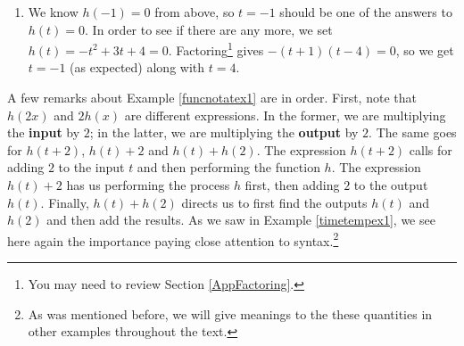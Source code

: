 \documentclass{ximera}
\begin{document}
\begin{example}
\begin{explanation}
\begin{enumerate}
\begin{enumerate}
\item  To find $h(t + 2)$, we substitute the quantity $t + 2$ in place of $t$: \[ \begin{array}{rclr}  
h(t + 2) & = & -(t + 2)^2 + 3(t + 2) + 4 & \\  
         & = & -\left(t\,^{2} + 4t + 4\right) + (3t + 6) + 4 & \\  
         & = & -t\,^{2} - 4t - 4 + 3t + 6 + 4 &  \\  
         & = & -t\,^{2} - t + 6. & 
       \end{array} \] To find $h(t) + 2$, we add $2$ to the expression for $h(t)$ \[ \begin{array}{rclr}  
h(t) + 2 & = & \left(-t\,^{2} + 3t + 4\right) + 2  & \\  
         & = & -t\,^{2} + 3t + 6. \\ 
         \end{array} \] From our work above, we see that $h(2) = 6$ so \[ \begin{array}{rclr}  
h(t) + h(2) & = & \left(-t\,^{2} + 3t + 4\right) + 6  & \\  
            & = & -t\,^{2} + 3t + 10. \\ 
            \end{array} \]

\end{enumerate}

\item   We know $h(-1) = 0$ from above, so $t=-1$ should be one of the answers to $h(t) = 0$.  In order to see if there are any more, we set  $h(t) = -t^2+3t+4 = 0$. Factoring\footnote{You may need to review Section \ref{AppFactoring}.} gives $-(t+1)(t-4) = 0$, so we get $t=-1$ (as expected) along with $t=4$.     
         
\end{enumerate}

\end{explanation}

\end{example}



A few remarks about Example \ref{funcnotatex1} are in order.  First, note that $h(2x)$ and $2 h(x)$ are different expressions.  In the former, we are multiplying the \textbf{input} by $2$;  in the latter, we are multiplying the \textbf{output} by $2$.  The same goes for $h(t + 2)$, $h(t) + 2$ and $h(t) + h(2)$.  The expression $h(t + 2)$ calls for adding $2$ to the input $t$ and then performing the function $h$.  The expression $h(t) + 2$ has us performing the process $h$ first, then adding $2$ to the output $h(t)$.  Finally, $h(t) + h(2)$ directs us to first find the outputs $h(t)$ and $h(2)$ and then add the results.  As we saw in Example \ref{timetempex1},  we see here again the importance paying close attention to syntax.\footnote{As was mentioned before, we will give meanings to the these quantities in other examples throughout the text.}
\end{document}
